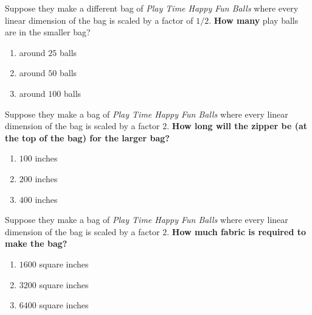 \documentclass[handout,noauthor,nooutcomes]{ximera}
\begin{document}
\begin{exercise}
   Suppose they make a different bag of \textit{Play Time Happy Fun
    Balls} where every linear dimension of the bag is scaled by a
  factor of $1/2$.  \textbf{How many} play balls are in the smaller bag?
  \begin{multicols}{3}
    \begin{enumerate}
  \item around $25$ balls
  \item around $50$ balls
  \item around $100$ balls
    \end{enumerate}
  \end{multicols}
\end{exercise}



\begin{exercise}
 Suppose they make a bag of \textit{Play Time Happy Fun Balls} where
 every linear dimension of the bag is scaled by a factor $2$.
 \textbf{How long will the zipper be (at the top of the bag) for the larger bag?}
 \begin{multicols}{3}
   \begin{enumerate}
  \item $100$ inches
  \item $200$ inches
  \item $400$ inches
   \end{enumerate}
 \end{multicols}
\end{exercise}



\begin{exercise}
  Suppose they make a bag of \textit{Play Time Happy Fun Balls} where
  every linear dimension of the bag is scaled by a factor $2$.
  \textbf{How much fabric is required to make the bag?}
  \begin{multicols}{3}
    \begin{enumerate}
    \item $1600$ square inches
    \item $3200$ square inches
    \item $6400$ square inches
    \end{enumerate}
  \end{multicols}
\end{exercise}




\end{document}
